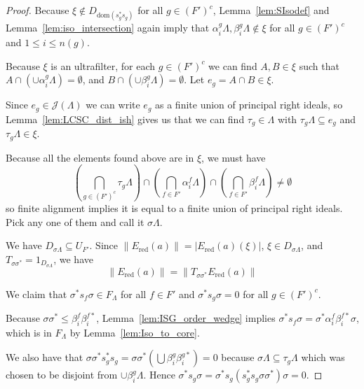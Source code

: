 \documentclass[12pt]{amsart}
\theoremstyle{definition}
\theoremstyle{remark}
\numberwithin{equation}{section}
\renewcommand{\L}{\Lambda}
\renewcommand{\a}{\alpha}
\renewcommand{\b}{\beta}
\newcommand{\dom}{\text{dom}}
\newcommand{\J}{\mathcal{J}}
\newcommand{\Ered}{E_{\text{red}}}
\begin{document}
\begin{proof}
		Because $\xi\notin D_{\dom(s_g^*s_g)}$ for all $g\in (F')^c$, Lemma~\ref{lem:SIsodef} and Lemma~\ref{lem:iso_intersection} again imply that $\a_i^g\L, \b_i^g\L\notin \xi$ for all $g\in (F')^c$ and $1\leq i\leq n(g)$. 
		
		Because $\xi$ is an ultrafilter, for each $g\in (F')^c$ we can find $A, B\in \xi$ such that $A\cap (\cup \a_i^g\L) = \emptyset$, and $B\cap (\cup \b_i^g\L) = \emptyset$. Let $e_g = A\cap B \in \xi$. 
		
		Since $e_g\in \J(\L)$ we can write $e_g$ as a finite union of principal right ideals, so Lemma~\ref{lem:LCSC_dist_ish} gives us that we can find $\tau_g\in\L$ with $\tau_g\L\subseteq e_g$ and $\tau_g\L\in\xi$. 
		
		Because all the elements found above are in $\xi$, we must have 
		\[
		\left(\bigcap_{g\in (F')^c}\tau_g\L\right)\cap\left(\bigcap_{f\in F'}\a_i^f\L\right)\cap \left(\bigcap_{f\in F'}\b_i^f\L\right) \neq \emptyset
		\]
		so finite alignment implies it is equal to a finite union of principal right ideals. Pick any one of them and call it $\sigma\L$. 
		
		We have $D_{\sigma\L}\subseteq U_{F'}$. Since $\|\Ered(a)\|=|\Ered(a)(\xi)|$, $\xi\in D_{\sigma\L}$, and $T_{\sigma\sigma^*}=1_{D_{\sigma\L}}$, we have 
		\begin{equation}
			\label{eqn:norm}
			\|\Ered(a)\| =\|T_{\sigma\sigma^*}\Ered(a)\|
		\end{equation} 
		
		We claim that $\sigma^*s_f\sigma\in F_\L$ for all $f\in F'$ and $\sigma^*s_g\sigma = 0$ for all $g\in (F')^c$. 
		
		Because $\sigma\sigma^*\leqslant \b_i^f\b_i^{f*}$, Lemma~\ref{lem:ISG_order_wedge} implies $\sigma^*s_f\sigma = \sigma^*\a_i^f\b_i^{f*}\sigma$, which is in $F_\L$ by Lemma~\ref{lem:Iso_to_core}.
		
		 We also have that $\sigma\sigma^*s_g^*s_g = \sigma\sigma^*\left(\bigcup \b_i^g\b_i^{g*}\right) = 0$ because $\sigma\L\subseteq \tau_g\L$ which was chosen to be disjoint from $\cup\b_i^g\L$. Hence $\sigma^*s_g\sigma = \sigma^*s_g(s_g^*s_g\sigma\sigma^*)\sigma = 0$. 
		 

\end{proof}
\end{document}
